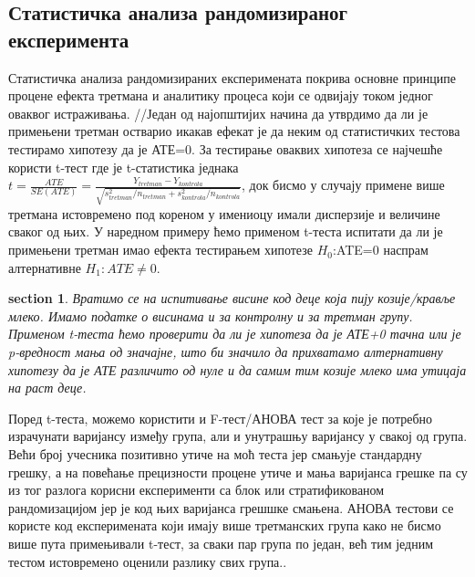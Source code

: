 \documentclass[12pt, a4paper]{article}
\newtheorem{primer}[Пример]{section}
\begin{document}
\subsection{Статистичка анализа рандомизираног експеримента}

Статистичка анализа рандомизираних експеримената покрива основне принципе процене ефекта третмана 
и аналитику процеса који се одвијају током једног оваквог истраживања.
//Један од најопштијих начина да утврдимо да ли је примењени третман остварио икакав ефекат је да 
неким од статистичких тестова тестирамо хипотезу да је АТЕ=0. За тестирање оваквих хипотеза се 
најчешће користи t-тест где је t-статистика једнака 
$t=\frac{ATE}{SE(ATE)}=\frac{Y_{tretman}-Y_{kontrola}}{\sqrt{s_{tretman}^2/n_{tretman}+s_{kontrola}^2/n_{kontrola}}}$, 
док бисмо у случају примене више третмана истовремено под кореном у имениоцу имали дисперзије и 
величине сваког од њих. У наредном примеру ћемо применом t-теста испитати да ли је примењени 
третман имао ефекта тестирањем хипотезе $H_0$:ATE=0 наспрам алтернативне $H_1:ATE\neq0$.

\begin{primer}
Вратимо се на испитивање висине код деце која пију козије/кравље млеко. Имамо податке о висинама и 
за контролну и за третман групу. Применом t-теста ћемо проверити да ли је хипотеза да је АТЕ+0 
тачна или је p-вредност мања од значајне, што би значило да прихватамо алтернативну хипотезу 
да је АТЕ различито од нуле и да самим тим козије млеко има утицаја на раст деце.
\end{primer}

Поред t-теста, можемо користити и F-тест/АНОВА тест за које је потребно израчунати варијансу 
између група, али и унутрашњу варијансу у свакој од група. Већи број учесника позитивно утиче на 
моћ теста јер смањује стандардну грешку, а на повећање прецизности процене утиче и мања варијанса 
грешке па су из тог разлога корисни експерименти са блок или стратификованом рандомизацијом јер 
је код њих варијанса грешшке смањена. АНОВА тестови се користе код експеримената који имају више 
третманских група како не бисмо више пута примењивали t-тест, за сваки пар група по један, већ 
тим једним тестом истовремено оценили разлику свих група..
\end{document}
